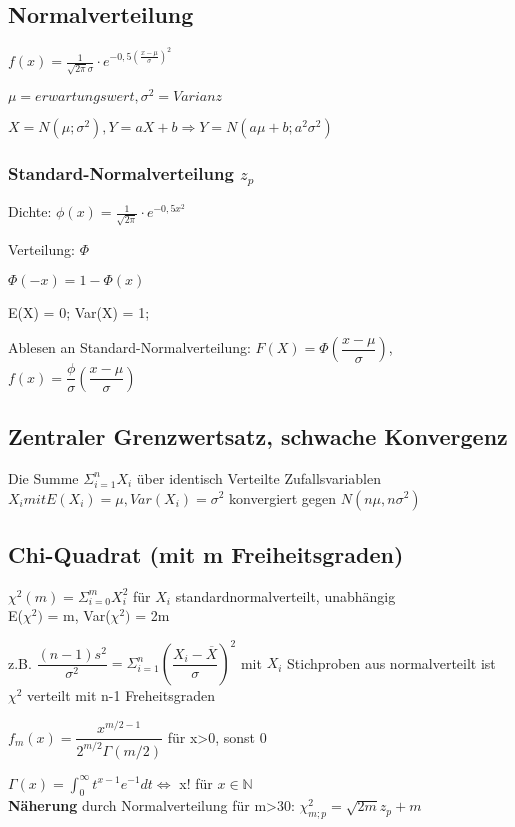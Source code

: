 \subsection*{Normalverteilung}
$f(x) = \frac{1}{\sqrt{2\pi}\sigma} \cdot e^{-0,5\left(\frac{x-\mu}{\sigma}\right)^2}$

$\mu = erwartungswert,\sigma^2 = Varianz$

$X = N(\mu;\sigma^2), Y = aX + b \Rightarrow Y = N(a\mu + b; a^2\sigma^2)$

\subsubsection*{Standard-Normalverteilung $z_p$}
Dichte: $\phi(x) = \frac{1}{\sqrt{2\pi}} \cdot e^{- 0,5 x^2}$

Verteilung: $\Phi$

$\Phi(-x) = 1-\Phi(x)$

E(X) = 0; Var(X) = 1;


Ablesen an Standard-Normalverteilung: $F(X) = \Phi \left(\dfrac{x-\mu}{\sigma} \right)$, $f(x) = \dfrac{\phi}{\sigma} \left(\dfrac{x-\mu}{\sigma} \right)$

\subsection*{Zentraler Grenzwertsatz, schwache Konvergenz}
Die Summe $\Sigma_{i=1}^nX_i$ über identisch Verteilte Zufallsvariablen $X_i mit E(X_i) = \mu, Var(X_i) = \sigma^2$ konvergiert gegen $N(n\mu,n\sigma^2)$






\subsection*{Chi-Quadrat (mit m Freiheitsgraden)}
$ \chi^2(m) = \Sigma_{i=0}^m X_i^2$ für $X_i$ standardnormalverteilt, unabhängig \\
E($\chi^2)$ = m, Var($\chi^2)$ = 2m

z.B. $\dfrac{(n-1)s^2}{\sigma^2} = \Sigma_{i=1}^n \left(\dfrac{X_i - \overline{X}}{\sigma}\right)^2$
mit $X_i$ Stichproben aus normalverteilt ist $\chi^2$ verteilt mit n-1 Freheitsgraden

$f_m(x) = \dfrac{x^{m/2-1}}{2^{m/2}\Gamma(m/2)}$ für x>0, sonst 0

$\Gamma (x) = \int_0 ^\infty t^{x-1} e^{-1}dt \Leftrightarrow$  x! für $x \in \mathbb{N}$ \\
\textbf{Näherung} durch Normalverteilung für m>30: $\chi^2_{m;p} = \sqrt{2m}z_p +m$

